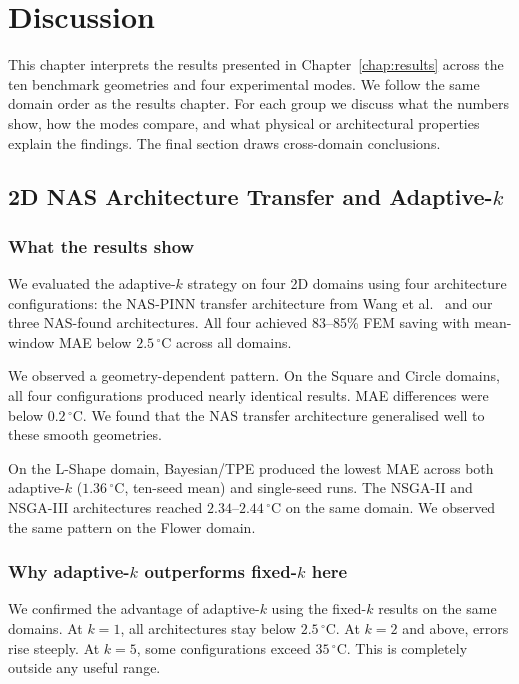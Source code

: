 \chapter{Discussion}
\label{chap:discussion}

This chapter interprets the results presented in Chapter~\ref{chap:results}
across the ten benchmark geometries and four experimental modes.
We follow the same domain order as the results chapter.
For each group we discuss what the numbers show, how the modes compare, and
what physical or architectural properties explain the findings.
The final section draws cross-domain conclusions.

\section{2D NAS Architecture Transfer and Adaptive-$k$}
\label{sec:disc_2d_adaptive}

\subsection{What the results show}

We evaluated the adaptive-$k$ strategy on four 2D domains using four architecture
configurations: the NAS-PINN transfer architecture from Wang et
al.~\cite{wang2023} and our three NAS-found architectures.
All four achieved 83--85\% FEM saving with mean-window MAE below
$2.5\,^\circ\mathrm{C}$ across all domains.

We observed a geometry-dependent pattern.
On the Square and Circle domains, all four configurations produced nearly
identical results.
MAE differences were below $0.2\,^\circ\mathrm{C}$.
We found that the NAS transfer architecture generalised well to these smooth geometries.

On the L-Shape domain, Bayesian/TPE produced the lowest MAE across both
adaptive-$k$ ($1.36\,^\circ\mathrm{C}$, ten-seed mean) and single-seed runs.
The NSGA-II and NSGA-III architectures reached $2.34$--$2.44\,^\circ\mathrm{C}$
on the same domain.
We observed the same pattern on the Flower domain.

\subsection{Why adaptive-$k$ outperforms fixed-$k$ here}

We confirmed the advantage of adaptive-$k$ using the fixed-$k$ results
on the same domains.
At $k=1$, all architectures stay below $2.5\,^\circ\mathrm{C}$.
At $k=2$ and above, errors rise steeply.
At $k=5$, some configurations exceed $35\,^\circ\mathrm{C}$.
This is completely outside any useful range.

